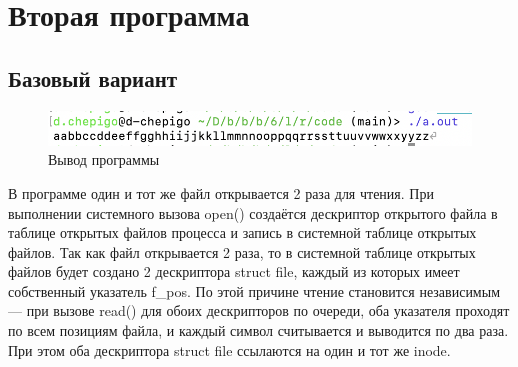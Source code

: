 \section{Вторая программа}
\subsection{Базовый вариант}


\begin{figure}[!hbpt]
	\centering
	\includegraphics[width=\textwidth]{image/2-1}
	\caption{Вывод программы}
\end{figure}

В программе один и тот же файл открывается 2 раза для чтения. При выполнении системного вызова open() создаётся дескриптор открытого файла в таблице открытых файлов процесса и запись в системной таблице открытых файлов. Так как файл открывается 2 раза, то в системной таблице открытых файлов будет создано 2 дескриптора struct file, каждый из которых имеет собственный указатель f\_pos. По этой причине чтение становится независимым --- при вызове read() для обоих дескрипторов по очереди, оба указателя проходят по всем позициям файла, и каждый символ считывается и выводится по два раза. При этом оба дескриптора struct file ссылаются на один и тот же inode.


\newpage
